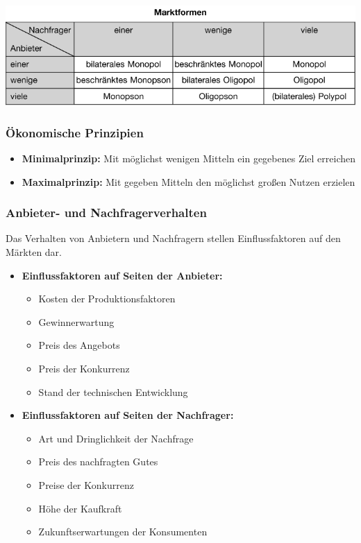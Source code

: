 \includegraphics[scale=0.6]{1jahr_pictures/lf01-pic/lf01-marktformen.png}

\subsubsection{Ökonomische Prinzipien}

\begin{itemize}
\setlength\itemsep{0em}
	\item \textbf{Minimalprinzip:} Mit möglichst wenigen Mitteln ein gegebenes Ziel erreichen
	\item \textbf{Maximalprinzip:} Mit gegeben Mitteln den möglichst großen Nutzen erzielen
\end{itemize}

\subsubsection{Anbieter- und Nachfragerverhalten}
Das Verhalten von Anbietern und Nachfragern stellen Einflussfaktoren auf den Märkten dar.

\begin{itemize}
	\setlength\itemsep{0em}
	\item {\bf Einflussfaktoren auf Seiten der Anbieter:}
	\begin{itemize}
	\setlength\itemsep{0em}
		\item Kosten der Produktionsfaktoren
		\item Gewinnerwartung
		\item Preis des Angebots
		\item Preis der Konkurrenz
		\item Stand der technischen Entwicklung
	\end{itemize}
	\item {\bf Einflussfaktoren auf Seiten der Nachfrager:}
	\begin{itemize}
	\setlength\itemsep{0em}
		\item Art und Dringlichkeit der Nachfrage
		\item Preis des nachfragten Gutes
		\item Preise der Konkurrenz
		\item Höhe der Kaufkraft
		\item Zukunftserwartungen der Konsumenten
	\end{itemize}
\end{itemize}


